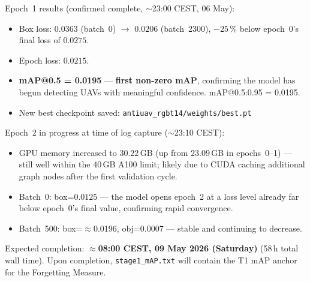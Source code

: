 \begin{enumerate}
          Epoch~1 results (confirmed complete, $\sim$23:00 CEST, 06 May):
          \begin{itemize}
              \item Box loss: $0.0363$ (batch~0) $\to$ $0.0206$ (batch~2300),
                    $-25\,\%$ below epoch~0's final loss of $0.0275$.
              \item Epoch loss: $0.0215$.
              \item \textbf{mAP@0.5 = 0.0195} — \textbf{first non-zero mAP},
                    confirming the model has begun detecting UAVs with
                    meaningful confidence. mAP@0.5:0.95 = 0.0195.
              \item New best checkpoint saved:
                    \texttt{antiuav\_rgbt14/weights/best.pt}
          \end{itemize}

          Epoch~2 in progress at time of log capture ($\sim$23:10 CEST):
          \begin{itemize}
              \item GPU memory increased to $30.22$\,GB (up from $23.09$\,GB
                    in epochs~0--1) — still well within the 40\,GB A100 limit;
                    likely due to CUDA caching additional graph nodes after the
                    first validation cycle.
              \item Batch~0: box=$0.0125$ — the model opens epoch~2 at a
                    loss level already far below epoch~0's final value,
                    confirming rapid convergence.
              \item Batch~500: box=$\approx$0.0196, obj=$0.0007$ — stable
                    and continuing to decrease.
          \end{itemize}

          Expected completion: $\approx$\textbf{08:00 CEST, 09 May 2026 (Saturday)}
          (58\,h total wall time). Upon completion,
          \texttt{stage1\_mAP.txt} will contain the T1 mAP anchor
          for the Forgetting Measure.


\end{enumerate}
